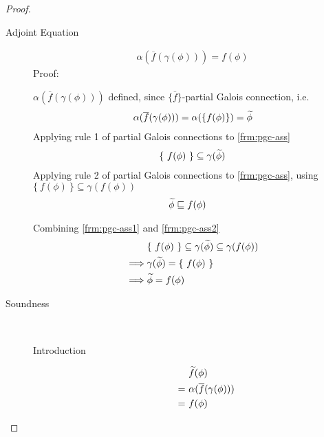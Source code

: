 \begin{proof}~
    \begin{description}
        \item[Adjoint Equation] 
        \begin{align*}
        \alpha(\overline{f}(\gamma(\phi))) = f(\phi)
        \end{align*}
        Proof:
        
        $\alpha(\overline{f}(\gamma(\phi)))$ defined, since $\{ \overline{f} \}$-partial Galois connection, i.e.
        \begin{align}
        \label{frm:pgc-ass}
        \alpha(\overline{f}(\gamma(\phi))) = \alpha(\{ f(\phi) \}) = \widetilde{\phi}
        \end{align}
        Applying rule 1 of partial Galois connections to \ref{frm:pgc-ass}
        \begin{align}
        \label{frm:pgc-ass1}
        &\{~ f(\phi) ~\} \subseteq \gamma(\widetilde{\phi})\\
        \end{align}
        Applying rule 2 of partial Galois connections to \ref{frm:pgc-ass}, using $\{~ f(\phi) ~\} \subseteq \gamma(f(\phi))$
        \begin{align}
        \label{frm:pgc-ass2}
        & \widetilde{\phi} \sqsubseteq f(\phi)
        \end{align}
        
        Combining \ref{frm:pgc-ass1} and \ref{frm:pgc-ass2}
        \begin{align*}
        &\{~ f(\phi) ~\} \subseteq \gamma(\widetilde{\phi}) \subseteq \gamma(f(\phi))\\
        \implies
        & \gamma(\widetilde{\phi}) = \{~ f(\phi) ~\}\\
        \implies
        & \widetilde{\phi} = f(\phi)
        \end{align*}
        
        \item[Soundness]~
        \begin{description}
            \item[Introduction] 
            \begin{align*}
            &\widetilde{f}(\phi)\\
            =~
            &\alpha(\overline{f}(\gamma(\phi)))\\
            =~ 
            &f(\phi)
            \end{align*}
            

\end{description}
\end{description}
\end{proof}
